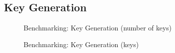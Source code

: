 \documentclass[]{final_report}
\begin{document}
\subsection{Key Generation}
\begin{figure}[H]
    \centering %
    
    \begin{minipage}{0.495\textwidth}
        \centering
       \caption{Benchmarking: Key Generation (number of keys)}
        \label{fig:image1}
    \end{minipage}
    \hfill %
    \begin{minipage}{0.495\textwidth}
        \centering
       \caption{Benchmarking: Key Generation (keys)}
        \label{fig:image2}
    \end{minipage}
    

\end{figure}
\end{document}

